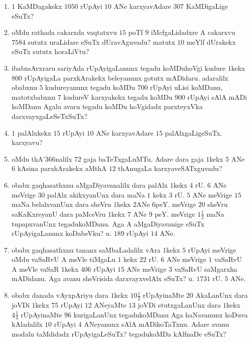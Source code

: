 \begin{enumerate}[\rm(1)]
\item $1$ KaMDagakekx $1050$ rUpAyi $10$ ANe karxyavAdare $307$ KaMDigaLige eSuTx?
\item oMdu rathada cakarxda vaqtatxvu $15$ poTf $9$ iMcfgaLidadxre A cakarxvu $7584$ sututx uraLidare eSuTx dUravAguvadu? matutx $10$ meYlf dUrakekx eSuTx sututx horaLiVtu?

\item ibabxsAvxraru sariyAda rUpAyigaLanunx tegadu koMDuhoVgi kudure $1$kekx $800$ rUpAyigaLa parxkArakekx beleyanunx gotutx mADidaru. adaralilx obabxnu $5$ kudureyanunx tegadu koMDu $700$ rUpAyi uLisi koMDanu, matotxbabxnu $7$ kudureV karxyakekx tegadu koMDu $900$ rUpAyi sAlA mADi koMDanu Agalu avaru tegadu koMDu hoVgidadx parxteyxVka darxvayxgaLeSeTxSuTx?

\item $1$ palAlxkekx $15$ rUpAyi $10$ ANe karxyavAdare $15$ palAlxgaLigeSuTx. karxyavu?

\item oMdu thA\char'366nalilx $72$ gaja baTeTxgaLuMTu. Adare dara gaja $1$kekx $5$ ANe $6$ kAsina parxkArakekx aMthA $12$ thAnugaLa karxyaveSATxguvadu?

\item obabx gaqhasathxnu aMgaDiyavanalilx dara palAlx $1$kekx $4$ rU. $6$ ANe meVrige $30$ palAlx akikxyanUnx dara maNa $1$ kekx $3$ rU. $5$ ANe meVrige $15$ maNa belalxvanUnx dara sheVru $1$kekx $2$ANe $6$peY. meVrige $20$ sheVru saKaKxreyanU dara paMceVru $1$kekx $7$ ANe $9$ peY. meVrige $1\frac{1}{2}$ maNa tupapxvanUnx tegadukoMDanu. Aga A aMgaDiyavanige eSuTx rUpAyigaLanunx koDabeVku?  \hfill u. $189$ rUpAyi $14$ ANe.

\item obabx gaqhasathxnu tananx saMbaLadalilx vAra $1$kekx $5$ rUpAyi meVrige oMdu vaSaRvU A meVle tiMgaLu $1$ kekx $22$ rU. $6$ ANe meVrige $1$ vaSaRvU A meVle vaSaR $1$kekx $406$ rUpAyi $15$ ANe meVrige $3$ vaSaRvU saMgarxha mADidanu. Aga avanu sheVrisida darxvayxvelAlx eSuTx?
\hfill u. $1731$ rU. $5$ ANe.

\item obabx danada vAyxpAriyu dara $1$kekx $10\frac{1}{2}$ rUpAyinaMte $20$ AkaLanUnx dara joVDi $1$kekx $75$ rUpAyi $12$ ANeyaMte $13$ joVDi etutxgaLanUnx dara $1$kekx $4\frac{1}{4}$ rUpAyinaMte $96$ kurigaLanUnx tegadukoMDanu Aga haNavanunx koDuva kAladalilx $10$ rUpAyi $4$ ANeyanunx sAlA mADikoTaTxnu. Adare avanu modalu taMdidadx rUpAyigaLeSuTx? tegadukoMDa kAlfnaDe eSuTx?


\end{enumerate}
